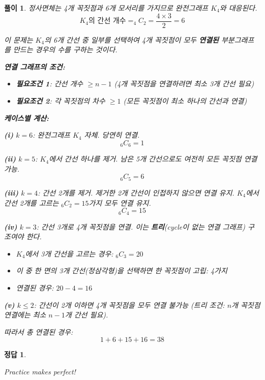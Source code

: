 \documentclass[12pt,a4paper]{article}
\theoremstyle{test_form}
\newtheorem*{solution}{풀이}
\newtheorem*{answer}{정답}
\begin{document}
\begin{solution}
정사면체는 4개 꼭짓점과 6개 모서리를 가지므로 완전그래프 \(K_4\)와 대응된다.
\[
K_4\text{의 간선 개수} = _4C_2 = \frac{4 \times 3}{2} = 6
\]

이 문제는 \(K_4\)의 6개 간선 중 일부를 선택하여 4개 꼭짓점이 모두 \textbf{연결된} 부분그래프를 만드는 경우의 수를 구하는 것이다.

\textbf{연결 그래프의 조건:}
\begin{itemize}
\item \textbf{필요조건 1}: 간선 개수 \(\geq n-1\) (4개 꼭짓점을 연결하려면 최소 3개 간선 필요)
\item \textbf{필요조건 2}: 각 꼭짓점의 차수 \(\geq 1\) (모든 꼭짓점이 최소 하나의 간선과 연결)
\end{itemize}

\textbf{케이스별 계산:}

\textbf{(i)} \(k=6\): 완전그래프 \(K_4\) 자체. 당연히 연결.
\[
_6C_6 = 1
\]

\textbf{(ii)} \(k=5\): \(K_4\)에서 간선 하나를 제거. 남은 5개 간선으로도 여전히 모든 꼭짓점 연결 가능.
\[
_6C_5 = 6
\]

\textbf{(iii)} \(k=4\): 간선 2개를 제거. 제거한 2개 간선이 인접하지 않으면 연결 유지. \(K_4\)에서 간선 2개를 고르는 \(_6C_2=15\)가지 모두 연결 유지.
\[
_6C_4 = 15
\]

\textbf{(iv)} \(k=3\): 간선 3개로 4개 꼭짓점을 연결. 이는 \textbf{트리}(cycle이 없는 연결 그래프) 구조여야 한다.
\begin{itemize}
\item \(K_4\)에서 3개 간선을 고르는 경우: \(_6C_3 = 20\)
\item 이 중 한 면의 3개 간선(정삼각형)을 선택하면 한 꼭짓점이 고립: 4가지
\item 연결된 경우: \(20 - 4 = 16\)
\end{itemize}

\textbf{(v)} \(k \leq 2\): 간선이 2개 이하면 4개 꼭짓점을 모두 연결 불가능 (트리 조건: \(n\)개 꼭짓점 연결에는 최소 \(n-1\)개 간선 필요).

따라서 총 연결된 경우:
\[
1 + 6 + 15 + 16 = 38
\]
\end{solution}

\begin{answer}
\hfill {}
\end{answer}

\vspace{1cm}
\begin{center}
    \textit{Practice makes perfect!}
\end{center}
\end{document}
